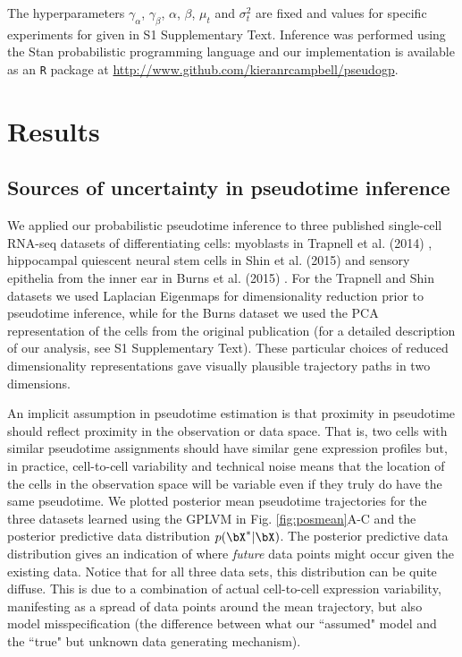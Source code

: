 The hyperparameters $\gamma_\alpha$, $\gamma_\beta$, $\alpha$, $\beta$, $\mu_t$ and $\sigma_t^2$ are fixed and values for specific experiments for given in S1 Supplementary Text. Inference was performed using the Stan probabilistic programming language \cite{gelman2015stan} and our implementation is available as an \texttt{R} package at \url{http://www.github.com/kieranrcampbell/pseudogp}.






\section{Results}



\subsection{Sources of uncertainty in pseudotime inference}

We applied our probabilistic pseudotime inference to three published single-cell RNA-seq datasets of differentiating cells: myoblasts in Trapnell et al. (2014) \cite{Trapnell2014}, hippocampal quiescent neural stem cells in Shin et al. (2015) \cite{Shin2015} and sensory epithelia from the inner ear in Burns et al. (2015) \cite{Burns2015}. For the Trapnell and Shin datasets we used Laplacian Eigenmaps \cite{Belkin2003} for dimensionality reduction prior to pseudotime inference, while for the Burns dataset we used the PCA representation of the cells from the original publication (for a detailed description of our analysis, see S1 Supplementary Text). These particular choices of reduced dimensionality representations gave visually plausible trajectory paths in two dimensions.

An implicit assumption in pseudotime estimation is that proximity in pseudotime should reflect proximity in the observation or data space. That is, two cells with similar pseudotime assignments should have similar gene expression profiles but, in practice, cell-to-cell variability and technical noise means that the location of the cells in the observation space will be variable even if they truly do have the same pseudotime. We plotted posterior mean pseudotime trajectories for the three datasets learned using the GPLVM in Fig. \ref{fig:posmean}A-C and the posterior predictive data distribution $p(\bX^*|\bX)$. The posterior predictive data distribution gives an indication of where \emph{future} data points might occur given the existing data. Notice that for all three data sets, this distribution can be quite diffuse. This is due to a combination of actual cell-to-cell expression variability, manifesting as a spread of data points around the mean trajectory, but also model misspecification (the difference between what our ``assumed" model and the ``true" but unknown data generating mechanism).


